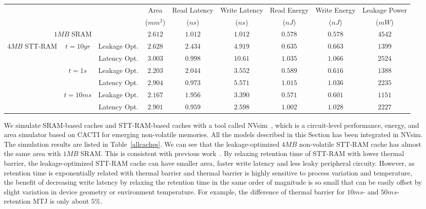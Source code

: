 \begin{table*}[t]
 \scriptsize
  \centering
  \caption{16-way L2 Cache Simulation Results}
  \label{allcaches}
  \begin{tabular}{| c | c | c  | c | c | c | c | c | c |}
  	\hline\hline
  	\multirow{2}{*}{} & \multirow{2}{*}{} & \multirow{2}{*}{} & Area  & Read Latency & Write Latency & Read Energy & Write Energy & Leakage Power\\
  & & & ($mm^2$) & ($ns$) & ($ns$) & ($nJ$) & ($nJ$) & ($mW$) \\
  	\hline\hline
  	\multicolumn{3}{|c|}{$1MB$ SRAM} & $2.612$ & $1.012$ & $1.012$ & $0.578$ & $0.578$ &$4542$ \\
  	\hline
  	\multirow{8}{*}{$4MB$ STT-RAM} & \multirow{2}{*}{$t=10yr$} & Leakage Opt.& $2.628$ & $2.434$ & $4.919$ & $0.635$ & $0.663$ & $1399$ \\
  	\cline{3-3}\cline{4-9}
  	& & Latency Opt. & $3.003$ & $0.998$ & $10.61$ & $1.035$ & $1.066$ & $2524$ \\
  	\cline{2-3}\cline{4-9}
  	& \multirow{2}{*}{$t=1s$} & Leakage Opt. & $2.203$ & $2.044$ & $3.552$ & $0.589$ & $0.616$ & $1388$ \\
  	\cline{3-3}\cline{4-9}
  	& & Latency Opt. & $2.904$ & $0.973$ & $5.571$ & $1.015$ & $1.036$ & $2235$ \\
  	\cline{2-3}\cline{4-9}
    & \multirow{2}{*}{$t=10ms$} & Leakage Opt. & $2.167$ & $1.956$ & $3.390$ & $0.571$ & $0.601$ & $1151$ \\
  	\cline{3-3}\cline{4-9}
  	& & Latency Opt. & $2.901$ & $0.959$ & $2.598$ & $1.002$ & $1.028$ & $2227$ \\	
  	\hline\hline
  \end{tabular}
\end{table*}

We simulate SRAM-based caches and STT-RAM-based caches with a tool called NVsim~\cite{CACTI:PCRAMsim}, which is a circuit-level performance, energy, and area simulator based on CACTI for emerging non-volatile memories. All the models described in this Section has been integrated in NVsim. The simulation results are listed in Table~\ref{allcaches}. We can see that the leakage-optimized $4MB$ non-volatile STT-RAM cache has almost the same area with $1MB$ SRAM. This is consistent with previous work~\cite{CACTI:DAC08:Dong}. By relaxing retention time of STT-RAM with lower thermal barrier, the leakage-optimized STT-RAM cache can have smaller area, faster write latency and less leaky peripheral circuity. However, as retention time is exponentially related with thermal barrier and thermal barrier is highly sensitive to process variation and temperature, the benefit of decreasing write latency by relaxing the retention time in the same order of magnitude is so small that can be easily offset by slight variation in device geometry or environment temperature. For example, the difference of thermal barrier for $10ms$- and $50ms$- retention MTJ is only about $5\%$.

